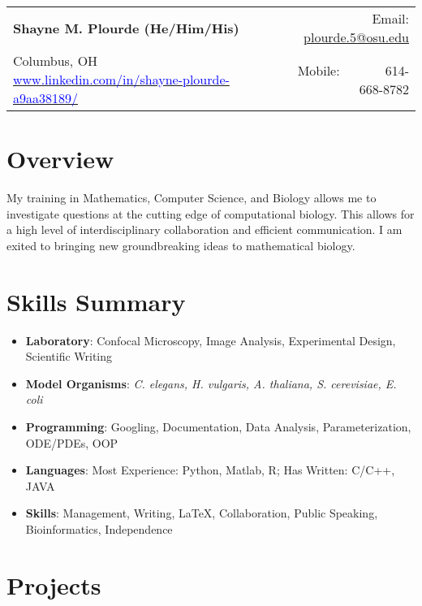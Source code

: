 \documentclass[letter,12pt]{article}
\newcommand{\resumeItem}[2]{
  \item\small{
    \textbf{#1}{: #2 \vspace{-4pt}}
  }
}
\newcommand{\resumeSubItem}[2]{\resumeItem{#1}{#2}\vspace{-3pt}}
\newcommand{\resumeSubHeadingListStart}{\begin{itemize}[leftmargin=*]}
\newcommand{\resumeSubHeadingListEnd}{\end{itemize}}
\begin{document}
\begin{tabular*}{\textwidth}{l@{\extracolsep{\fill}}r}
  \textbf{{\LARGE Shayne M. Plourde (He/Him/His)}}   &   Email: \href{mailto:}{plourde.5@osu.edu}\\
  Columbus, OH ~~~~~~~~~ \href{https://www.linkedin.com/in/shayne-plourde-a9aa38189/}{\textcolor{blue}{www.linkedin.com/in/shayne-plourde-a9aa38189/}} & Mobile:~~~~~~~614-668-8782 \\
\end{tabular*}

\vspace{-5pt}
\section{\textbf{Overview}}  
My training in Mathematics, Computer Science, and Biology allows me to investigate questions at the cutting edge of computational biology. This allows for a high level of interdisciplinary collaboration and efficient communication.
I am exited to bringing new groundbreaking ideas to mathematical biology.
\vspace{-5pt}
\section{\textbf{Skills Summary}}
	\resumeSubHeadingListStart
    \resumeSubItem{Laboratory}{Confocal Microscopy, Image Analysis, Experimental Design, Scientific Writing}
    \resumeSubItem{Model Organisms}{\it C. elegans, H. vulgaris, A. thaliana, S. cerevisiae, E. coli}
    \resumeSubItem{Programming}{Googling, Documentation, Data Analysis, Parameterization, ODE/PDEs, OOP}
	\resumeSubItem{Languages}{Most Experience: Python, Matlab, R; Has Written: C/C++, JAVA}
	\resumeSubItem{Skills}{Management, Writing, LaTeX, Collaboration, Public Speaking, Bioinformatics, Independence }

\resumeSubHeadingListEnd
\vspace{-5pt}

\section{\textbf{Projects}}
\end{document}
